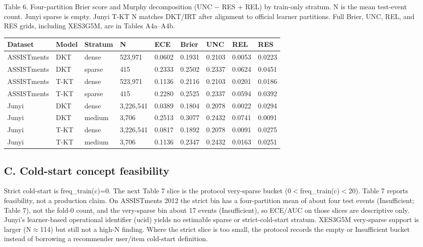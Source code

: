 \documentclass[10pt,a4paper]{article}
\begin{document}
\vspace{0.55em}
\noindent\begin{minipage}{\textwidth}
\centering
{\fontsize{8}{9.5}\selectfont Table 6. Four-partition Brier score and Murphy decomposition (UNC $-$ RES + REL) by train-only stratum. N is the mean test-event count. Junyi sparse is empty. Junyi T-KT N matches DKT/IRT after alignment to official learner partitions. Full Brier, UNC, REL, and RES grids, including XES3G5M, are in Tables A4a--A4b.\par}
\vspace{0.35em}
\begin{adjustbox}{max width=\textwidth}
{\small
\begin{tabular}{@{}lllllllll@{}}
\toprule
Dataset & Model & Stratum & N & ECE & Brier & UNC & REL & RES \\
\midrule
ASSISTments & DKT & dense & 523,971 & 0.0602 & 0.1931 & 0.2103 & 0.0053 & 0.0223 \\
ASSISTments & DKT & sparse & 415 & 0.2333 & 0.2502 & 0.2337 & 0.0624 & 0.0451 \\
ASSISTments & T-KT & dense & 523,971 & 0.1136 & 0.2116 & 0.2103 & 0.0201 & 0.0186 \\
ASSISTments & T-KT & sparse & 415 & 0.2280 & 0.2525 & 0.2337 & 0.0594 & 0.0392 \\
Junyi & DKT & dense & 3,226,541 & 0.0389 & 0.1804 & 0.2078 & 0.0022 & 0.0294 \\
Junyi & DKT & medium & 3,706 & 0.2513 & 0.3077 & 0.2432 & 0.0741 & 0.0091 \\
Junyi & T-KT & dense & 3,226,541 & 0.0817 & 0.1892 & 0.2078 & 0.0091 & 0.0275 \\
Junyi & T-KT & medium & 3,706 & 0.1136 & 0.2347 & 0.2432 & 0.0163 & 0.0251 \\
\bottomrule
\end{tabular}}
\end{adjustbox}
\end{minipage}
\vspace{0.55em}
\begin{multicols}{2}


\subsection*{C. Cold-start concept feasibility}

Strict cold-start is freq\_train(c)=0. The next Table 7 slice is the protocol very-sparse bucket (0$<$freq\_train(c)$<$20). Table 7 reports feasibility, not a production claim. On ASSISTments 2012 the strict bin has a four-partition mean of about four test events (Insufficient; Table 7), not the fold-0 count, and the very-sparse bin about 17 events (Insufficient), so ECE/AUC on those slices are descriptive only. Junyi's learner-based operational identifier (ucid) yields no estimable sparse or strict-cold-start stratum. XES3G5M very-sparse support is larger (N$\approx$114) but still not a high-N finding. Where the strict slice is too small, the protocol records the empty or Insufficient bucket instead of borrowing a recommender user/item cold-start definition.


\end{multicols}
\end{document}
